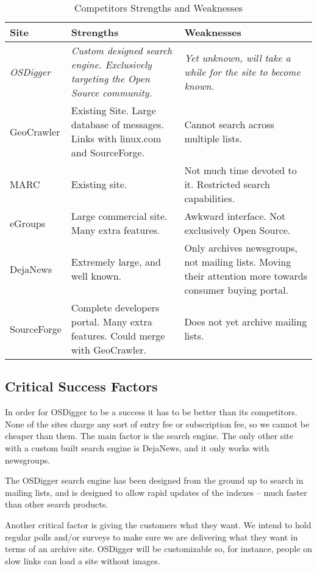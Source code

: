 \begin{table}[!ht]
  \begin{center}
    \begin{tabular}{|l|p{4cm}|p{4cm}|}
      \hline
      \textbf{Site} & \textbf{Strengths} & \textbf{Weaknesses} \\
      \hline
      \hline
      \emph{OSDigger} & \emph{Custom designed search engine.  Exclusively targeting the Open Source community.} & \emph{Yet unknown, will take a while for the site to become known.} \\
      \hline
      \hline
      GeoCrawler & Existing Site.  Large database of messages.  Links with linux.com and SourceForge. &  Cannot search across multiple lists.  \\
      \hline
      MARC & Existing site. & Not much time devoted to it.  Restricted search capabilities. \\
      \hline
      eGroups & Large commercial site.  Many extra features. & Awkward interface.  Not exclusively Open Source.\\
      \hline
      DejaNews & Extremely large, and well known. & Only archives newsgroups, not mailing lists. Moving their attention more towards consumer buying portal. \\
      \hline
      SourceForge & Complete developers portal.  Many extra features. Could merge with GeoCrawler. & Does not yet archive mailing lists. \\
      \hline

    \end{tabular}
    \caption{Competitors Strengths and Weaknesses}
    \label{tab:sw}
  \end{center}
\end{table}

\subsection{Critical Success Factors}
In order for OSDigger to be a success it has to be better than its competitors.  None of the sites charge any sort of entry fee or subscription fee, so we cannot be cheaper than them.  The main factor is the search engine.  The only other site with a custom built search engine is DejaNews, and it only works with newsgroups.

The OSDigger search engine has been designed from the ground up to search in mailing lists, and is designed to allow rapid updates of the indexes -- much faster than other search products.

Another critical factor is giving the customers what they want.  We intend to hold regular polls and/or surveys to make sure we are delivering what they want in terms of an archive site.  OSDigger will be customizable so, for instance, people on slow links can load a site without images.


